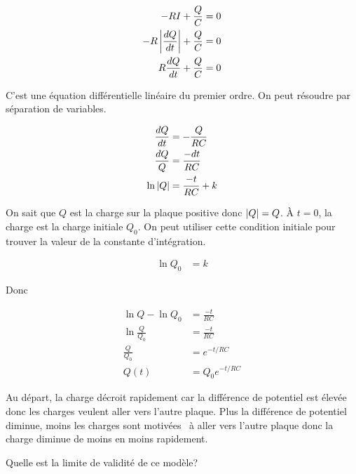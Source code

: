 \begin{align*}
  -RI + \frac{Q}{C} &= 0 \\
  -R \left| \frac{dQ}{dt} \right| + \frac{Q}{C} &= 0 \\
  R \frac{dQ}{dt} + \frac{Q}{C} &= 0
\end{align*}

C'est une équation différentielle linéaire du premier ordre. On peut résoudre
par séparation de variables.

\begin{align*}
  \frac{dQ}{dt} &= -\frac{Q}{RC} \\
  \frac{dQ}{Q} &= \frac{-dt}{RC} \\
  \ln\left| Q \right| &= \frac{-t}{RC} + k
\end{align*}

On sait que $Q$ est la charge sur la plaque positive donc $\left| Q \right| = Q$. À $t =
0$, la charge est la charge initiale $Q_0$. On peut utiliser cette condition
initiale pour trouver la valeur de la constante d'intégration.

\begin{align*}
  \ln Q_0 &= k
\end{align*}

Donc

\begin{align*}
  \ln Q - \ln Q_0 &= \frac{-t}{RC} \\
  \ln \frac{Q}{Q_0} &= \frac{-t}{RC} \\
  \frac{Q}{Q_0} &= e^{-t/RC} \\
  Q(t) &= Q_0 e^{-t/RC}
\end{align*}



Au départ, la charge décroit rapidement car la différence de potentiel est
élevée donc les charges veulent aller vers l'autre plaque. Plus la différence
de potentiel diminue, moins les charges sont \og motivées \fg\ à aller vers
l'autre plaque donc la charge diminue de moins en moins rapidement.

Quelle est la limite de validité de ce modèle?

